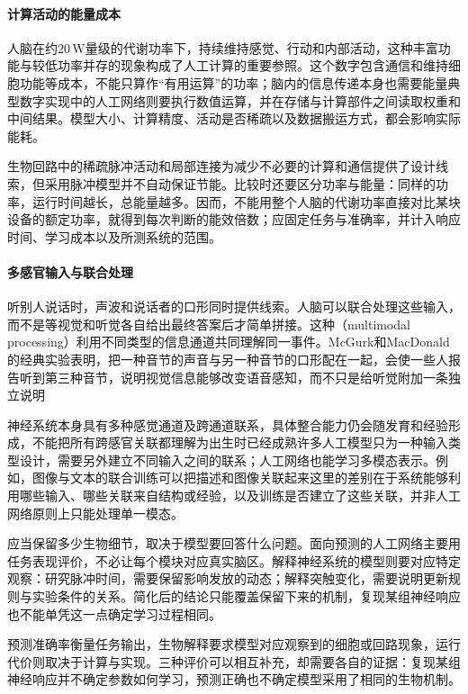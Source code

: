 \paragraph{计算活动的能量成本}
人脑在约$20\,\mathrm{W}$量级的代谢功率下，持续维持感觉、行动和内部活动，这种丰富功能与较低功率并存的现象构成了人工计算的重要参照。这个数字包含通信和维持细胞功能等成本，不能只算作“有用运算”的功率；脑内的信息传递本身也需要能量典型数字实现中的人工网络则要执行数值运算，并在存储与计算部件之间读取权重和中间结果。模型大小、计算精度、活动是否稀疏以及数据搬运方式，都会影响实际能耗。

生物回路中的稀疏脉冲活动和局部连接为减少不必要的计算和通信提供了设计线索，但采用脉冲模型并不自动保证节能。比较时还要区分功率与能量：同样的功率，运行时间越长，总能量越多。因而，不能用整个人脑的代谢功率直接对比某块设备的额定功率，就得到每次判断的能效倍数；应固定任务与准确率，并计入响应时间、学习成本以及所测系统的范围。

\paragraph{多感官输入与联合处理}
听别人说话时，声波和说话者的口形同时提供线索。人脑可以联合处理这些输入，而不是等视觉和听觉各自给出最终答案后才简单拼接。这种（multimodal processing）利用不同类型的信息通道共同理解同一事件。McGurk和MacDonald的经典实验表明，把一种音节的声音与另一种音节的口形配在一起，会使一些人报告听到第三种音节，说明视觉信息能够改变语音感知，而不只是给听觉附加一条独立说明

神经系统本身具有多种感觉通道及跨通道联系，具体整合能力仍会随发育和经验形成，不能把所有跨感官关联都理解为出生时已经成熟许多人工模型只为一种输入类型设计，需要另外建立不同输入之间的联系；人工网络也能学习多模态表示。例如，图像与文本的联合训练可以把描述和图像关联起来这里的差别在于系统能够利用哪些输入、哪些关联来自结构或经验，以及训练是否建立了这些关联，并非人工网络原则上只能处理单一模态。

应当保留多少生物细节，取决于模型要回答什么问题。面向预测的人工网络主要用任务表现评价，不必让每个模块对应真实脑区。解释神经系统的模型则要对应特定观察：研究脉冲时间，需要保留影响发放的动态；解释突触变化，需要说明更新规则与实验条件的关系。简化后的结论只能覆盖保留下来的机制，复现某组神经响应也不能单凭这一点确定学习过程相同。

预测准确率衡量任务输出，生物解释要求模型对应观察到的细胞或回路现象，运行代价则取决于计算与实现。三种评价可以相互补充，却需要各自的证据：复现某组神经响应并不确定参数如何学习，预测正确也不确定模型采用了相同的生物机制。

